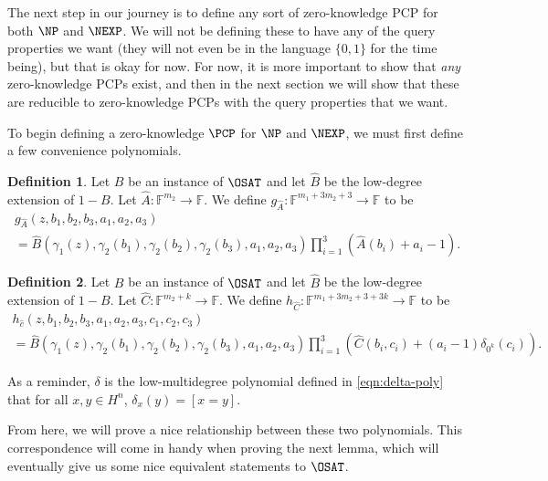 \documentclass[english,12pt]{reedthesis}
\theoremstyle{plain}
\theoremstyle{definition}
\newtheorem{defn}[defn]{Definition}
\theoremstyle{remark}
\begin{document}
The next step in our journey is to define any sort of zero-knowledge PCP for
both $\NP$ and $\NEXP$. We will not be defining these to have any of the query
properties we want (they will not even be in the language $\{0, 1\}$ for the
time being), but that is okay for now. For now, it is more important to show
that \emph{any} zero-knowledge PCPs exist, and then in the next section we will
show that these are reducible to zero-knowledge PCPs with the query properties
that we want.

To begin defining a zero-knowledge $\PCP$ for $\NP$ and $\NEXP$, we must first
define a few convenience polynomials.

\begin{defn}\label{def:g_a}
  Let $B$ be an instance of $\OSAT$ and let $\hat{B}$ be the low-degree
  extension of $1 - B$. Let $\hat{A}\colon \mathbb{F}^{m_{2}} \rightarrow \mathbb{F}$. We
  define $g_{\hat{A}}\colon \mathbb{F}^{m_{1} + 3m_{2} + 3} \rightarrow \mathbb{F}$ to be
  \begin{multline}
    g_{\hat{A}}(z, b_{1}, b_{2}, b_{3}, a_{1}, a_{2}, a_{3}) \\ =
    \hat{B}(\gamma_{1}(z), \gamma_{2}(b_{1}), \gamma_{2}(b_{2}), \gamma_{2}(b_{3}), a_{1}, a_{2}, a_{3})
    \prod_{i=1}^{3}(\hat{A}(b_{i}) + a_{i} - 1).
  \end{multline}
\end{defn}

\begin{defn}\label{def:h_c}
  Let $B$ be an instance of $\OSAT$ and let $\hat{B}$ be the low-degree
  extension of $1 - B$. Let $\hat{C}\colon \mathbb{F}^{m_{2} + k} \rightarrow \mathbb{F}$.
  We define
  $h_{\hat{C}}\colon \mathbb{F}^{m_{1} + 3m_{2} + 3 + 3k} \rightarrow \mathbb{F}$ to be
  \begin{multline}
    h_{\hat{c}}(z, b_{1}, b_{2}, b_{3}, a_{1}, a_{2}, a_{3}, c_{1}, c_{2}, c_{3}) \\ =
    \hat{B}(\gamma_{1}(z), \gamma_{2}(b_{1}), \gamma_{2}(b_{2}), \gamma_{2}(b_{3}), a_{1}, a_{2}, a_{3})
    \prod_{i=1}^{3}(\hat{C}(b_{i}, c_{i}) + (a_{i} - 1)\delta_{0^{k}}(c_{i})).
  \end{multline}
\end{defn}

As a reminder, $\delta$ is the low-multidegree polynomial defined in
\cref{eqn:delta-poly} that for all $x, y \in H^{n}$, $\delta_{x}(y) = [x = y]$.

From here, we will prove a nice relationship between these two polynomials.
This correspondence will come in handy when proving the next lemma, which will
eventually give us some nice equivalent statements to $\OSAT$.
\end{document}
